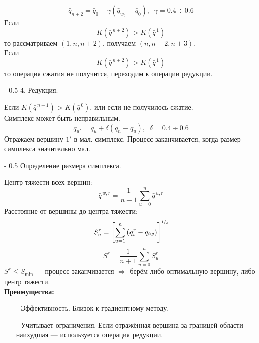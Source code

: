 \documentclass[12pt,a5paper]{scrbook}
\makeatletter
\renewcommand\paragraph{\@startsection{paragraph}{4}{0mm}%
{-\baselineskip} %
{0.5\baselineskip} %
{\normalfont\bfseries}}%
\makeatother
\begin{document}
  $$\bar{q}_{n+2} = \bar{q}_0 + \gamma(\bar{q}_{w_0} - \bar{q}_0),\;\;\gamma=0.4\div0.6$$
  Если
  $$K(\bar{q}^{\,n+2}) > K(\bar{q}^{\,1})$$
  то рассматриваем $(1,n,n+2)$, получаем $(n,n+2,n+3)$.\\
  Если 
  $$K(\bar{q}^{\,n+2}) > K(\bar{q}^{\,1})$$
  то операция сжатия не получится, переходим к операции редукции.
  
  \paragraph{4. Редукция.}
  
  Если $K(\bar{q}^{\,n+1}) > K(\bar{q}^{\,0})$, или если не получилось сжатие.\\
  Симплекс может быть неправильным.
  $$\bar{q}_{u'} = \bar{q}_u + \delta(\bar{q}_n - \bar{q}_u),\;\;\delta=0.4\div0.6$$
  Отражаем вершину $1'$ в мал. симплекс. Процесс заканчивается, когда размер симплекса значительно мал.
  
  \paragraph{Определение размера симплекса.}
  
  Центр тяжести всех вершин:
  $$\bar{q}^{\,w,r} = \frac{1}{n+1}\sum_{u=0}^n \bar{q}^{\,u,r}$$
  Расстояние от вершины до центра тяжести:
  $$S_u^r = \left[ \sum_{u=1}^n \left(q_i^r - q_{iw}\right) \right]^{\sfrac{1}{2}}$$
  $$S^r = \frac{1}{n+1}\sum_{u=0}^n S_u^r$$
  $S^r \leq S_{\text{min}}$ --- процесс заканчивается $\Rightarrow$ берём либо оптимальную вершину, либо центр тяжести.\\
  
  \textbf{Преимущества:}
  \begin{itemize}
   \item[-] Эффективность. Близок к градиентному методу.
   \item[-] Учитывает ограничения. Если отражённая вершина за границей области наихудшая --- используется операция редукции.
  \end{itemize}
  
\end{document}
